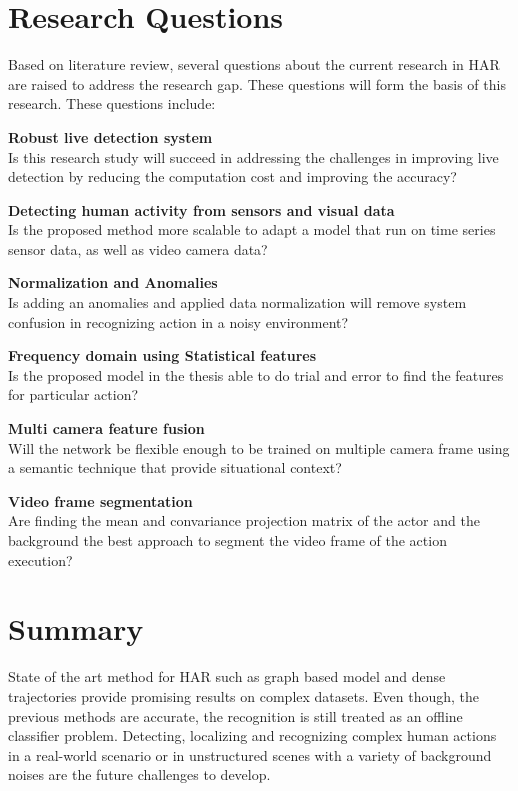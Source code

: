 \section{Research Questions}
\hspace{5mm} Based on literature review, several questions about the current research in HAR are raised to address the research gap. These questions will form the basis of this research. These questions include:\\
\begin{description}
    \item \textbf{Robust live detection system}\hfill \\
    Is this research study will succeed in addressing the challenges in improving live detection by reducing the computation cost and improving the accuracy?
   
    \item \textbf{Detecting human activity from sensors and visual data}\hfill \\
    Is the proposed method more scalable to adapt a model that run on time series sensor data, as well as video camera data? 

    \item \textbf{Normalization and Anomalies}\hfill \\
    Is adding an anomalies and applied data normalization will remove system confusion in recognizing action in a noisy environment?
    
    \item \textbf{Frequency domain using Statistical features}\hfill \\
    Is the proposed model in the thesis able to do trial and error to find the features for particular action?
    
    \item \textbf{Multi camera feature fusion} \hfill \\
    Will the network be flexible enough to be trained on multiple camera frame using a semantic technique that provide situational context?
    
    \item \textbf{Video frame segmentation}\hfill \\
    Are finding the mean and convariance projection matrix of the actor and the background the best approach to segment the video frame of the action execution?
    
\end{description}

\section{Summary}
\hspace{5mm} State of the art method for HAR such as graph based model and dense trajectories provide promising results on complex datasets. Even though, the previous methods are accurate, the recognition is still treated as an offline classifier problem. Detecting, localizing and recognizing complex human actions in a real-world scenario or in unstructured scenes with a variety of background noises are the future challenges to develop.\\

